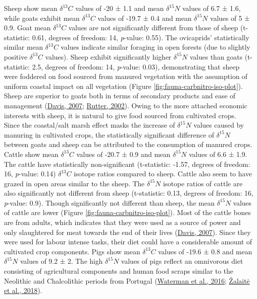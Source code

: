 \documentclass[3p]{elsarticle} %
\begin{document}
Sheep show mean \(\delta ^{13}C\) values of -20 ± 1.1\text{\textperthousand} and mean \(\delta ^{15}N\) values of 6.7 ± 1.6\text{\textperthousand}, while goats exhibit mean \(\delta ^{13}C\) values of -19.7 ± 0.4\text{\textperthousand} and mean \(\delta ^{15}N\) values of 5 ± 0.9\text{\textperthousand}. Goat mean \(\delta ^{13}C\) values are not significantly different from those of sheep (t-statistic: 0.61, degrees of freedom: 14, \emph{p}-value: 0.55). The ovicaprids' statistically similar mean \(\delta ^{13}C\) values indicate similar foraging in open forests (due to slightly positive \(\delta ^{13}C\) values). Sheep exhibit significantly higher \(\delta ^{15}N\) values than goats (t-statistic: 2.5, degrees of freedom: 14, \emph{p}-value: 0.03), demonstrating that sheep were foddered on food sourced from manured vegetation with the assumption of uniform coastal impact on all vegetation (Figure \ref{fig:fauna-carbnitro-iso-plot}). Sheep are superior to goats both in terms of secondary products and ease of management (\protect\hyperlink{ref-davis07}{Davis, 2007}; \protect\hyperlink{ref-rutter02}{Rutter, 2002}). Owing to the more attached economic interests with sheep, it is natural to give food sourced from cultivated crops. Since the coastal/salt marsh effect masks the increase of \(\delta ^{15}N\) values caused by manuring in cultivated crops, the statistically significant difference of \(\delta ^{15}N\) between goats and sheep can be attributed to the consumption of manured crops. Cattle show mean \(\delta ^{13}C\) values of -20.7 ± 0.9\text{\textperthousand} and mean \(\delta ^{15}N\) values of 6.6 ± 1.9\text{\textperthousand}. The cattle have statistically non-significant (t-statistic: -1.57, degrees of freedom: 16, \emph{p}-value: 0.14) \(\delta ^{13}C\) isotope ratios compared to sheep. Cattle also seem to have grazed in open areas similar to the sheep. The \(\delta ^{15}N\) isotope ratios of cattle are also significantly not different from sheep (t-statistic: 0.13, degrees of freedom: 16, \emph{p}-value: 0.9). Though significantly not different than sheep, the mean \(\delta ^{15}N\) values of cattle are lower (Figure \ref{fig:fauna-carbnitro-iso-plot}). Most of the cattle bones are from adults, which indicates that they were used as a source of power and only slaughtered for meat towards the end of their lives (\protect\hyperlink{ref-davis07}{Davis, 2007}). Since they were used for labour intense tasks, their diet could have a considerable amount of cultivated crop components. Pigs show mean \(\delta ^{13}C\) values of -19.6 ± 0.8\text{\textperthousand} and mean \(\delta ^{15}N\) values of 9.2 ± 2\text{\textperthousand}. The high \(\delta ^{15}N\) values of pigs reflect an omnivorous diet consisting of agricultural components and human food scraps similar to the Neolithic and Chalcolithic periods from Portugal (\protect\hyperlink{ref-waterman_etal16}{Waterman et al., 2016}; \protect\hyperlink{ref-zalaite_etal18}{Žalaitė et al., 2018}).
\end{document}
